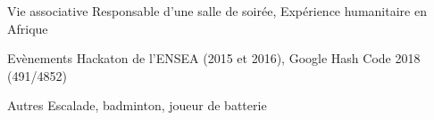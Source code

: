 

\begin{cvskills}

	\cvskill
	{Vie associative} %
	{Responsable d'une salle de soirée, Expérience humanitaire en Afrique} %

	\cvskill
	{Evènements} %
	{Hackaton de l'ENSEA (2015 et 2016), Google Hash Code 2018 (491/4852)} %

	\cvskill
	{Autres} %
	{Escalade, badminton, joueur de batterie} %


\end{cvskills}